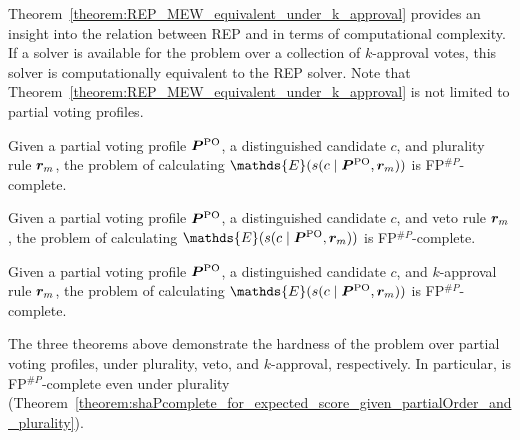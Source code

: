 Theorem~\ref{theorem:REP_MEW_equivalent_under_k_approval} provides an insight into the relation between REP and \esc in terms of computational complexity.
If a solver is available for the \esc problem over a collection of $k$-approval votes, this solver is computationally equivalent to the REP solver.
Note that Theorem~\ref{theorem:REP_MEW_equivalent_under_k_approval} is not limited to partial voting profiles.

\def\theoremHardnessForEscGivenPartialOrderAndPlurality{
    Given a partial voting profile $\partialVP$, a distinguished candidate $c$, and plurality rule $\vr_m$, the \esc problem of calculating $\mathds{E}(\score(c \mid \partialVP, \vr_m))$ is FP$^{\#P}$-complete.
}

\begin{theorem} \label{theorem:shaPcomplete_for_expected_score_given_partialOrder_and_plurality}
    \theoremHardnessForEscGivenPartialOrderAndPlurality
\end{theorem}

\def\theoremHardnessForEscGivenPartialOrderAndVeto{
    Given a partial voting profile $\partialVP$, a distinguished candidate $c$, and veto rule $\vr_m$, the \esc problem of calculating $\mathds{E}(\score(c \mid \partialVP, \vr_m))$ is FP$^{\#P}$-complete.
}

\begin{theorem} \label{theorem:shaPcomplete_for_expected_score_given_partialOrder_and_veto}
	\theoremHardnessForEscGivenPartialOrderAndVeto
\end{theorem}

\def\theoremHardnessForExpectedScoreGivenPartialOrderAndKApproval{
    Given a partial voting profile $\partialVP$, a distinguished candidate $c$, and $k$-approval rule $\vr_m$, the \esc problem of calculating $\mathds{E}(\score(c \mid \partialVP, \vr_m))$ is FP$^{\#P}$-complete.
}

\begin{theorem} \label{theorem:shaPcomplete_for_expected_score_given_partialOrder_and_k_approval}
    \theoremHardnessForExpectedScoreGivenPartialOrderAndKApproval
\end{theorem}

The three theorems above demonstrate the hardness of the \esc problem over partial voting profiles, under plurality, veto, and $k$-approval, respectively.
In particular, \esc is FP$^{\#P}$-complete even under plurality (Theorem~\ref{theorem:shaPcomplete_for_expected_score_given_partialOrder_and_plurality}).
